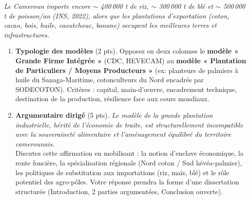 \documentclass[11pt]{article}
\begin{document}
\begin{exercice}
\emph{Le Cameroun importe encore $\sim$ 400\,000 t de riz, $\sim$ 300\,000 t de blé et $\sim$ 500\,000 t de poisson/an (INS, 2022), alors que les plantations d'exportation (coton, cacao, bois, huile, caoutchouc, banane) occupent les meilleures terres et infrastructures.}
\begin{enumerate}
\item \textbf{Typologie des modèles} (2 pts). Opposez en deux colonnes le \textbf{modèle « Grande Firme Intégrée »} (CDC, HEVECAM) au \textbf{modèle « Plantation de Particuliers / Moyens Producteurs »} (ex: planteurs de palmiers à huile du Sanaga-Maritime, cotonculteurs du Nord encadrés par SODECOTON). Critères : capital, main-d'œuvre, encadrement technique, destination de la production, résilience face aux cours mondiaux.
\item \textbf{Argumentaire dirigé} (5 pts). \og \textit{Le modèle de la grande plantation industrielle, hérité de l'économie de traite, est structurellement incompatible avec la souveraineté alimentaire et l'aménagement équilibré du territoire camerounais.} \fg\\
Discutez cette affirmation en mobilisant : la notion d'enclave économique, la rente foncière, la spécialisation régionale (Nord coton / Sud hévéa-palmier), les politiques de substitution aux importations (riz, maïs, blé) et le rôle potentiel des agro-pôles. Votre réponse prendra la forme d'une dissertation structurée (Introduction, 2 parties argumentées, Conclusion ouverte).
\end{enumerate}
\end{exercice}
\end{document}
